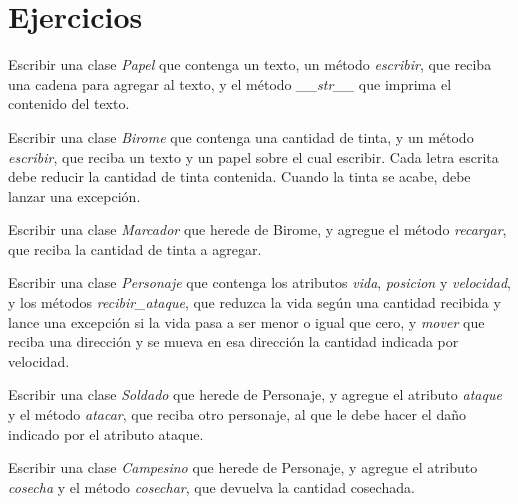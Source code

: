 \newpage
\section{Ejercicios}

\begin{partes}
    \item Escribir una clase {\it Papel} que contenga un texto, un método {\it
escribir}, que reciba una cadena para agregar al texto, y el método {\it
\_\_str\_\_} que imprima el contenido del texto.
    \item Escribir una clase {\it Birome} que contenga una cantidad de tinta, y
un método {\it escribir}, que reciba un texto y un papel sobre el cual
escribir. Cada letra escrita debe reducir la cantidad de tinta contenida.
Cuando la tinta se acabe, debe lanzar una excepción.
    \item Escribir una clase {\it Marcador} que herede de Birome, y agregue el
método {\it recargar}, que reciba la cantidad de tinta a agregar.
\end{partes}


\begin{partes}
    \item Escribir una clase {\it Personaje} que contenga los atributos {\it
vida}, {\it posicion} y {\it velocidad}, y los métodos {\it
recibir\_ataque}, que reduzca la vida según una cantidad recibida y lance
una excepción si la vida pasa a ser menor o igual que cero, y {\it
mover} que reciba una dirección y se mueva en esa dirección la cantidad
indicada por velocidad.
    \item Escribir una clase {\it Soldado} que herede de Personaje, y agregue
el atributo {\it ataque} y el método {\it atacar}, que reciba otro
personaje, al que le debe hacer el daño indicado por el atributo ataque.
    \item Escribir una clase {\it Campesino} que herede de Personaje, y agregue
el atributo {\it cosecha} y el método {\it cosechar}, que devuelva la
cantidad cosechada.
\end{partes}

